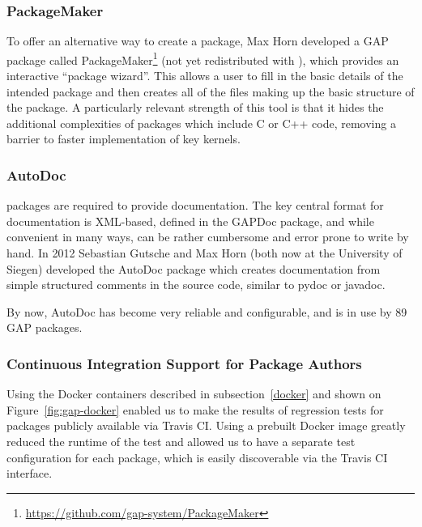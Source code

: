 \subsubsection{PackageMaker}
To offer an alternative way to create a package,
Max Horn developed a GAP package called
{\sf PackageMaker}\footnote{\url{https://github.com/gap-system/PackageMaker}}
(not yet redistributed with \GAP),
which provides an interactive  ``package wizard''. This allows a
user to fill in the basic details 
of the intended package and then creates all of the files making up
the basic structure of the package. A particularly relevant
strength of this tool is that it hides the additional complexities of
packages which include C or C++ code, removing a barrier to faster implementation
of key kernels.

\subsubsection{AutoDoc}
\GAP packages are required to provide documentation.  The key central
format for \GAP documentation is XML-based, defined in the {\sf
  GAPDoc} package, and while convenient in many ways, can be rather
cumbersome and error prone to write by hand.
In 2012 Sebastian Gutsche 
and Max Horn (both now at the University of Siegen) developed the 
{\sf AutoDoc} package \cite{autodoc} which creates
documentation from simple structured comments in the source code,
similar to {\sf pydoc} or {\sf javadoc}.

By now, {\sf AutoDoc} has become very reliable and configurable, and
is in use by 89 GAP packages.
%
%

\subsubsection{Continuous Integration Support for Package Authors}
Using the Docker containers described in subsection~\ref{docker}
and shown on Figure~\ref{fig:gap-docker} enabled us to make the
results of regression tests for \GAP packages publicly
available via Travis CI. Using a prebuilt Docker image 
greatly reduced the runtime of the test and allowed us to
have a separate test configuration for each package,
which is easily discoverable via the Travis CI interface.

